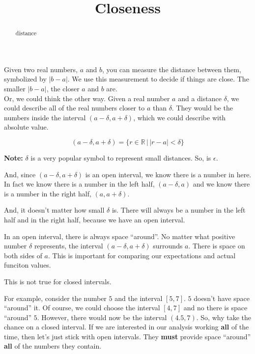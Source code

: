 \documentclass{ximera}
\title{Closeness}
\begin{document}
\begin{abstract}
distance
\end{abstract}
\maketitle










Given two real numbers, $a$ and $b$, you can measure the distance between them, symbolized by $|b-a|$.  We use this measurement to decide if things are close.  The smaller $|b-a|$, the closer $a$ and $b$ are. \\



Or, we could think the other way.  Given a real number $a$ and a distance $\delta$, we could describe all of the real numbers closer to $a$ than $\delta$.  They would be the numbers inside the interval $(a-\delta, a+\delta)$, which we could describe with absolute value.

\[      (a-\delta, a+\delta) = \{ r \in \mathbb{R} \, | \, |r - a| < \delta        \}       \]


\textbf{Note:}  $\delta$ is a very popular symbol to represent small distances.  So, is $\epsilon$.



And, since $(a-\delta, a+\delta)$ is an open interval, we know there is a number in here.  In fact we know there is a number in the left half, $(a-\delta, a)$ and we know there is a number in the right half, $(a, a+\delta)$.


And, it doesn't matter how small $\delta$ is.  There will always be a number in the left half and in the right half, because we have an open interval.


In an open interval, there is always space ``around''.  No matter what positive number $\delta$ represents, the interval $(a-\delta, a+\delta)$ surrounds $a$.  There is space on both sides of $a$. This is important for comparing our expectations and actual funciton values.





This is not true for closed intervals.


For example, consider the number $5$ and the interval $[5, 7]$.  $5$ doesn't have space ``around'' it. Of course, we could choose the interval $[4,7]$ and no there is space ``around'' $5$.  However, there would now be the interval $(4.5, 7)$.  So, why take the chance on a closed interval.  If we are interested in our analysis working \textbf{\textcolor{red!80!black}{all}} of the time, then let's just stick with open intervals.  They \textbf{must} provide space ``around'' \textbf{\textcolor{red!80!black}{all}} of the numbers they contain.
\end{document}
